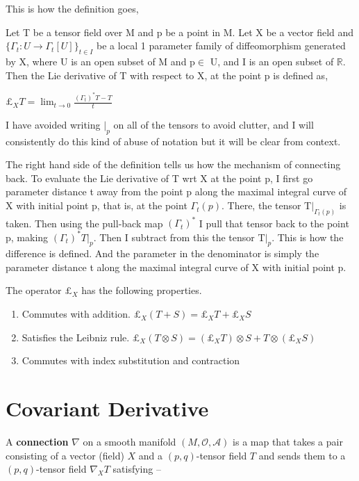 This is how the definition goes,



\begin{definition}
    Let T be a tensor field over M and p be a point in M. Let X be a vector field and $\{\Gamma_t: U \longrightarrow \Gamma_t[U]\}_{t\in I}$ be a local 1 parameter family of diffeomorphism generated by X, where U is an open subset of M and p$\in$ U, and I is an open subset of $\mathbb{R}$. Then the Lie derivative of T with respect to X, at the point p is defined as,
    
    $\pounds_X T = \displaystyle\lim_{t \to 0} \frac{(\Gamma_t)^*T-T}{t}$
    
  
\end{definition}

I have avoided writing $\big|_p$ on all of the tensors to avoid clutter, and I will consistently do this kind of abuse of notation but it will be clear from context. 

The right hand side of the definition tells us how the mechanism of connecting back. To evaluate the Lie derivative of T wrt X at the point p, I first go parameter distance t away from the point p along the maximal integral curve of X with initial point p, that is, at the point $\Gamma_t(p)$. There, the tensor T$\big|_{\Gamma_t(p)}$ is taken. Then using the pull-back map $(\Gamma_t)^*$ I pull that tensor back to the point p, making $(\Gamma_t)^*T\big|_p$. Then I subtract from this the tensor T$\big|_p$. This is how the difference is defined. And the parameter in the denominator is simply the parameter distance t along the maximal integral curve of X with initial point p.

\begin{proposition}
    The operator $\pounds_X$ has the following properties.
    \begin{enumerate}
        \item Commutes with addition. $\pounds_X(T+S)=\pounds_XT+ \pounds_XS$
        \item Satisfies the Leibniz rule. $\pounds_X(T\otimes S)=(\pounds_XT) \otimes S +T \otimes (\pounds_XS)$
        \item Commutes with index substitution and contraction
    \end{enumerate}
\end{proposition}








\section{Covariant Derivative}
A \textbf{connection} $\nabla$ on a smooth manifold $(M, \mathcal{O}, \mathcal{A})$ is a map that takes a pair consisting of a vector (field) $X$ and a $(p,q)$-tensor field $T$ and sends them to a $(p,q)$-tensor field $\nabla_X T$ satisfying  --

